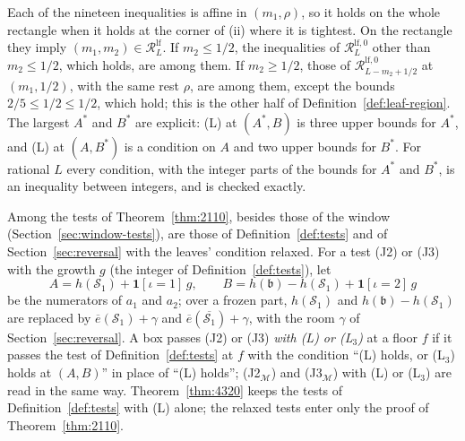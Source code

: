 \documentclass[11pt]{article}
\theoremstyle{definition}
\begin{document}
Each of the nineteen inequalities is affine in $(m_1, \rho)$, so it holds on the whole rectangle when it holds at the
corner of (ii) where it is tightest. On the rectangle they imply $(m_1, m_2) \in \mathcal R^{\mathrm{lf}}_L$. If $m_2
\le 1/2$, the inequalities of $\mathcal R^{\mathrm{lf},0}_L$ other than $m_2 \le 1/2$, which holds, are among them. If
$m_2 \ge 1/2$, those of $\mathcal R^{\mathrm{lf},0}_{L - m_2 + 1/2}$ at $(m_1, 1/2)$, with the
same rest $\rho$, are among them, except the bounds $2/5 \le 1/2 \le 1/2$, which hold; this is the other half of
Definition~\ref{def:leaf-region}. The largest $A^*$ and
$B^*$ are explicit: (L) at $(A^*, B)$ is
three
upper bounds for $A^*$, and (L) at $(A, B^*)$ is a condition on $A$ and two upper bounds for $B^*$. For rational $L$
every condition, with the integer parts of the bounds for $A^*$ and $B^*$, is an inequality between integers, and is
checked exactly.

Among the tests of Theorem~\ref{thm:2110}, besides those of the window (Section~\ref{sec:window-tests}), are those of
Definition~\ref{def:tests} and of Section~\ref{sec:reversal} with the leaves' condition relaxed. For a test (J2) or
(J3) with the growth $g$ (the integer of Definition~\ref{def:tests}), let
\[
  A = h(\mathcal S_1) + \mathbf 1[\iota = 1]\, g, \qquad B = h(\mathfrak b) - h(\mathcal S_1) + \mathbf 1[\iota = 2]\, g
\]
be the numerators of $a_1$ and $a_2$; over a frozen part, $h(\mathcal S_1)$ and $h(\mathfrak b) - h(\mathcal S_1)$ are
replaced by $\overline e(\mathcal S_1) + \gamma$ and $\overline e(\overline{\mathcal S_1}) + \gamma$, with the room
$\gamma$ of Section~\ref{sec:reversal}. A box passes (J2) or (J3) \emph{with (L) or (L$_3$)} at a floor $f$ if it
passes the test of Definition~\ref{def:tests} at $f$ with the condition ``(L) holds, or (L$_3$) holds at $(A, B)$'' in
place of ``(L) holds''; (J2$_{\mathcal M}$) and (J3$_{\mathcal M}$) with (L) or (L$_3$) are read in the same way.
Theorem~\ref{thm:4320} keeps
the tests of Definition~\ref{def:tests} with (L) alone; the relaxed tests enter only the proof of
Theorem~\ref{thm:2110}.
\end{document}
